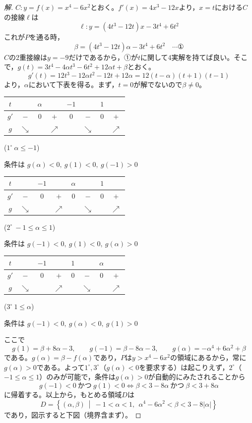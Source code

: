 \documentclass[../main.tex]{subfiles}
\begin{document}
\begin{proof}[解]
  $C: y=f(x)=x^4-6x^2$とおく。$f'(x)=4x^3-12x$より，$x=t$における$C$の接線$\ell$は
  \[
    \ell: y=(4t^3-12t)x-3t^4+6t^2
  \]
  これが$P$を通る時，
  \[
    \beta=(4t^3-12t)\alpha-3t^4+6t^2 \quad \cdots \text{①}
  \]
  $C$の2重接線は$y=-9$だけであるから，①が$t$に関して4実解を持てば良い。そこで，$g(t)=3t^4-4\alpha t^3-6t^2+12\alpha t+\beta$とおく。
  \[
    g'(t)=12t^3-12\alpha t^2-12t+12\alpha=12(t-\alpha)(t+1)(t-1)
  \]
  より，$\alpha$において下表を得る。まず，$t=0$が解でないので$\beta\ne0$。

  \begin{center}
    \begin{tabular}{c|ccccccc}
      $t$ & & $\alpha$ & & $-1$ & & $1$ & \\
      \hline
      $g'$ & $-$ & $0$ & $+$ & $0$ & $-$ & $0$ & $+$ \\
      \hline
      $g$ & $\searrow$ & & $\nearrow$ & & $\searrow$ & & $\nearrow$
    \end{tabular}
    \quad ($1^\circ\ \alpha\le-1$)
  \end{center}
  条件は $g(\alpha)<0,\ g(1)<0,\ g(-1)>0$

  \begin{center}
    \begin{tabular}{c|ccccccc}
      $t$ & & $-1$ & & $\alpha$ & & $1$ & \\
      \hline
      $g'$ & $-$ & $0$ & $+$ & $0$ & $-$ & $0$ & $+$ \\
      \hline
      $g$ & $\searrow$ & & $\nearrow$ & & $\searrow$ & & $\nearrow$
    \end{tabular}
    \quad ($2^\circ\ -1\le\alpha\le1$)
  \end{center}
  条件は $g(-1)<0,\ g(1)<0,\ g(\alpha)>0$

  \begin{center}
    \begin{tabular}{c|ccccccc}
      $t$ & & $-1$ & & $1$ & & $\alpha$ & \\
      \hline
      $g'$ & $-$ & $0$ & $+$ & $0$ & $-$ & $0$ & $+$ \\
      \hline
      $g$ & $\searrow$ & & $\nearrow$ & & $\searrow$ & & $\nearrow$
    \end{tabular}
    \quad ($3^\circ\ 1\le\alpha$)
  \end{center}
  条件は $g(-1)<0,\ g(\alpha)<0,\ g(1)>0$

  ここで
  \[
    g(1)=\beta+8\alpha-3,\qquad g(-1)=\beta-8\alpha-3,\qquad g(\alpha)=-\alpha^4+6\alpha^2+\beta
  \]
  である。$g(\alpha)=\beta-f(\alpha)$であり，$P$は$y>x^4-6x^2$の領域にあるから，常に$g(\alpha)>0$である。よって$1^\circ,3^\circ$（$g(\alpha)<0$を要求する）は起こりえず，$2^\circ$（$-1\le\alpha\le1$）のみが可能で，条件は$g(\alpha)>0$が自動的にみたされることから
  \[
    g(-1)<0\ \text{かつ}\ g(1)<0 \iff \beta<3-8\alpha\ \text{かつ}\ \beta<3+8\alpha
  \]
  に帰着する。以上から，もとめる領域$D$は
  \[
    D=\left\{(\alpha,\beta)\ \middle|\ -1<\alpha<1,\ \ \alpha^4-6\alpha^2<\beta<3-8|\alpha|\right\}
  \]
  であり，図示すると下図（境界含まず）。


\end{proof}
\end{document}
